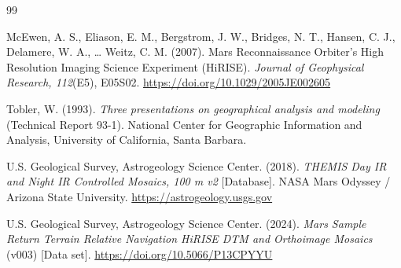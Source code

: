 \documentclass{article}
\begin{document}
\newpage

\begin{thebibliography}{99}

McEwen, A. S., Eliason, E. M., Bergstrom, J. W., Bridges, N. T., Hansen, C. J., Delamere, W. A., \ldots{} Weitz, C. M. (2007). Mars Reconnaissance Orbiter's High Resolution Imaging Science Experiment (HiRISE). \emph{Journal of Geophysical Research, 112}(E5), E05S02. \url{https://doi.org/10.1029/2005JE002605}

Tobler, W. (1993). \emph{Three presentations on geographical analysis and modeling} (Technical Report 93-1). National Center for Geographic Information and Analysis, University of California, Santa Barbara.

U.S. Geological Survey, Astrogeology Science Center. (2018). \emph{THEMIS Day IR and Night IR Controlled Mosaics, 100 m v2} [Database]. NASA Mars Odyssey / Arizona State University. \url{https://astrogeology.usgs.gov}

U.S. Geological Survey, Astrogeology Science Center. (2024). \emph{Mars Sample Return Terrain Relative Navigation HiRISE DTM and Orthoimage Mosaics} (v003) [Data set]. \url{https://doi.org/10.5066/P13CPYYU}

\end{thebibliography}
\end{document}
